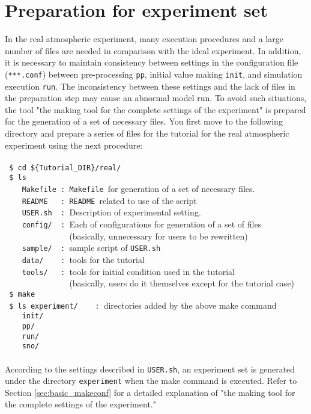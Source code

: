 \section{Preparation for experiment set} \label{sec:tutorial_real_prep}

In the real atmospheric experiment,
many execution procedures and a large number of files are needed in comparison with the ideal experiment.
In addition, it is necessary to maintain consistency between settings in the configuration file (\verb|***.conf|)
between pre-processing \verb|pp|, initial value making \verb|init|, and simulation execution \verb|run|.
The inconsistency between these settings and the lack of files in the preparation step may cause an abnormal model run.
To avoid such situations, the tool "the making tool for the complete settings of the experiment"
is prepared for the generation of a set of necessary files.
You first move to the following directory and prepare a series of files for the tutorial for the real atmospheric experiment using the next procedure:\\
\\
\verb| $ cd ${Tutorial_DIR}/real/|\\
\verb| $ ls|\\
\verb|    Makefile : Makefile |for generation of a set of necessary files.\\
\verb|    README   : README |related to use of the script\\
\verb|    USER.sh  : |Description of experimental setting.\\
\verb|    config/  : |Each of configurations for generation of a set of files\\
\verb|               |(basically, unnecessary for users to be rewritten)\\
\verb|    sample/  : |sample script of \verb|USER.sh|\\
\verb|    data/    : |tools for the tutorial\\
\verb|    tools/   : |tools for initial condition used in the tutorial\\
\verb|               |(basically, users do it themselves except for the tutorial case)\\
\verb| $ make|\\
\verb| $ ls experiment/    : |directories added by the above make command\\
\verb|    init/|\\
\verb|    pp/|\\
\verb|    run/|\\
\verb|    sno/|\\
\\
According to the settings described in \verb|USER.sh|,
an experiment set is generated under the directory \verb|experiment| when the make command is executed.
Refer to Section \ref{sec:basic_makeconf} for a detailed explanation of "the making tool for the complete settings of the experiment."

